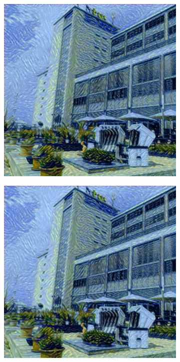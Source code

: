 \begin{figure}[H]
    \centering
    \begin{subfigure}[h]{0.15\textwidth}
        \centering
        \includegraphics[width=\textwidth]{resources/content/experiments/b__starry_night__768x768__style-weight_1e+08__tv-weight_1e-07.jpg}
    \end{subfigure}
    \begin{subfigure}[h]{0.15\textwidth}
        \centering
        \includegraphics[width=\textwidth]{resources/content/experiments/b__starry_night__768x768__style-weight_1e+08__tv-weight_1e-06.jpg}

\end{subfigure}
\end{figure}
